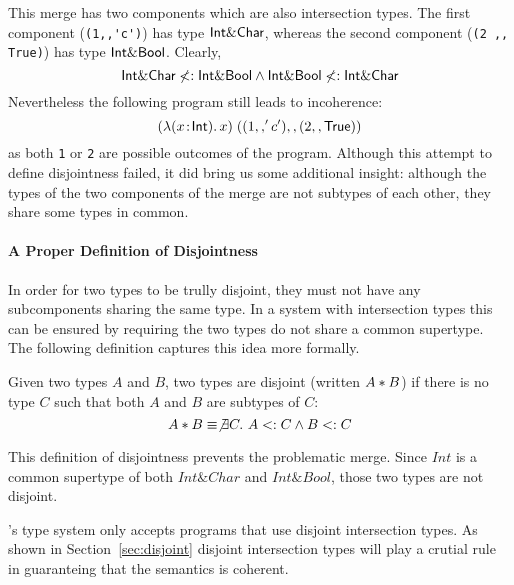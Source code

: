 \noindent This merge has two components which are also intersection
types. The first component (\lstinline{(1,,'c')}) has type $\textsf{Int} \&
\textsf{Char}$, whereas the second component (\lstinline{(2 ,, True)}) has type
$\textsf{Int} \& \textsf{Bool}$. Clearly,
\[ \textsf{Int} \& \textsf{Char} \not <: \textsf{Int} \& \textsf{Bool} \wedge \textsf{Int} \& \textsf{Bool} \not <: \textsf{Int} \& \textsf{Char} \]
Nevertheless the following program still leads to
incoherence:
\[ (\lambda (x \!:\! \textsf{Int}).\, x) \; ((1 ,, 'c') ,, (2 ,, \textsf{True})) \]
as both \lstinline{1} or \lstinline{2} are possible outcomes
of the program. Although this attempt to define disjointness failed,
it did bring us some additional insight: although the types of the two
components of the merge are not subtypes of each other, they share
some types in common.

\paragraph{A Proper Definition of Disjointness} In order for two types
to be trully disjoint, they must not have any subcomponents sharing
the same type. In a system with intersection types this can be ensured
by requiring the two types do not share a common supertype. The
following definition captures this idea more formally.

\begin{definition}[Disjointness]
  Given two types $A$ and $B$, two types are disjoint
  (written $A * B$) if there is no type $C$ such that both $A$ and $B$ are
  subtypes of $C$:
  \[A * B \equiv \not\exists C.~A <: C \wedge B <: C\]
\end{definition}

\noindent This definition of disjointness prevents the problematic
merge. Since $Int$ is a common supertype of both $Int \& Char$ and
$Int \& Bool$, those two types are not disjoint.

\name's type system only accepts programs that use disjoint
intersection types. As shown in Section~\ref{sec:disjoint} disjoint intersection
types will play a crutial rule in guaranteing that the semantics is coherent.

